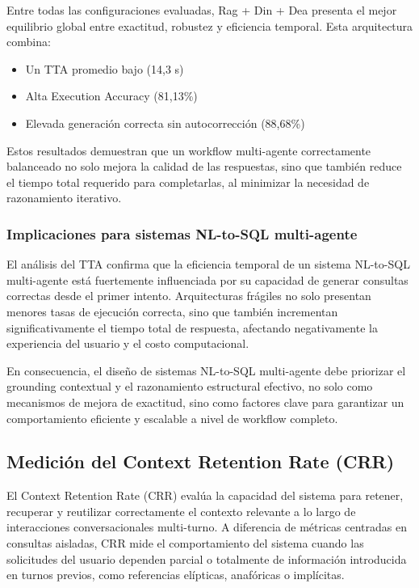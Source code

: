 \documentclass[journal]{IEEEtran}
\begin{document}
Entre todas las configuraciones evaluadas, Rag + Din + Dea presenta el mejor equilibrio global entre exactitud, robustez y eficiencia temporal. Esta arquitectura combina:

\begin{itemize}
	\item Un TTA promedio bajo (14,3 s)
	\item Alta Execution Accuracy (81,13\%)
	\item Elevada generación correcta sin autocorrección (88,68\%)
\end{itemize}

Estos resultados demuestran que un workflow multi-agente correctamente balanceado no solo mejora la calidad de las respuestas, sino que también reduce el tiempo total requerido para completarlas, al minimizar la necesidad de razonamiento iterativo.

\subsubsection{Implicaciones para sistemas NL-to-SQL multi-agente}

El análisis del TTA confirma que la eficiencia temporal de un sistema NL-to-SQL multi-agente está fuertemente influenciada por su capacidad de generar consultas correctas desde el primer intento. Arquitecturas frágiles no solo presentan menores tasas de ejecución correcta, sino que también incrementan significativamente el tiempo total de respuesta, afectando negativamente la experiencia del usuario y el costo computacional.

En consecuencia, el diseño de sistemas NL-to-SQL multi-agente debe priorizar el grounding contextual y el razonamiento estructural efectivo, no solo como mecanismos de mejora de exactitud, sino como factores clave para garantizar un comportamiento eficiente y escalable a nivel de workflow completo.

\subsection{Medición del Context Retention Rate (CRR)}
\label{sec:crr_dialogo}

El Context Retention Rate (CRR) evalúa la capacidad del sistema para retener, recuperar y reutilizar correctamente el contexto relevante a lo largo de interacciones conversacionales multi-turno. A diferencia de métricas centradas en consultas aisladas, CRR mide el comportamiento del sistema cuando las solicitudes del usuario dependen parcial o totalmente de información introducida en turnos previos, como referencias elípticas, anafóricas o implícitas.
\end{document}
